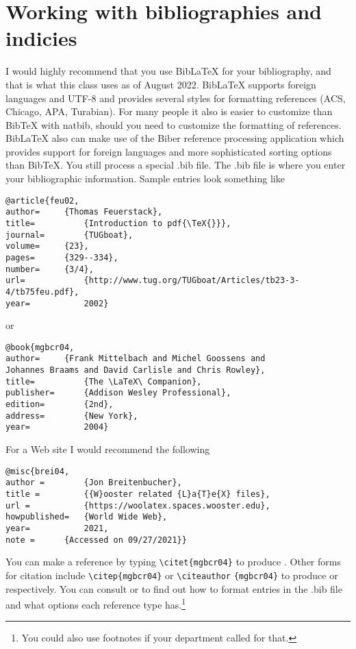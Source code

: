 \chapter{Working with bibliographies and indicies}\label{bibind}
I would highly recommend that you use Bib\LaTeX{} for your bibliography, and that is what this class uses as of August 2022. Bib\LaTeX{} supports foreign languages and UTF-8 and provides several styles for formatting references (ACS, Chicago, APA, Turabian). For many people it also is easier to customize than Bib\TeX{} with natbib, should you need to customize the formatting of references. Bib\LaTeX{} also can make use of the Biber reference processing application which provides support for foreign languages and more sophisticated sorting options than Bib\TeX{}. You still process a special .bib file. The .bib file is where you enter your bibliographic information. Sample entries look something like
\begin{singlespace}\small
\begin{verbatim}
@article{feu02,
author=		{Thomas Feuerstack},
title=			{Introduction to pdf{\TeX{}}}, 
journal=		{TUGboat}, 
volume=		{23},
pages=		{329--334},
number=		{3/4},
url=			{http://www.tug.org/TUGboat/Articles/tb23-3-4/tb75feu.pdf},
year=			2002}
\end{verbatim}
\end{singlespace}
or
\begin{singlespace}\small
\begin{verbatim}
@book{mgbcr04,
author=		{Frank Mittelbach and Michel Goossens and
Johannes Braams and David Carlisle and Chris Rowley},
title=			{The \LaTeX\ Companion},
publisher=		{Addison Wesley Professional},
edition=		{2nd},
address=		{New York},
year=			2004}
\end{verbatim}
\end{singlespace}

For a Web site I would recommend the following
\begin{singlespace}\small
\begin{verbatim}
@misc{brei04,
author = 		{Jon Breitenbucher},
title = 		{{W}ooster related {L}a{T}e{X} files},
url = 			{https://woolatex.spaces.wooster.edu},
howpublished=	{World Wide Web},
year=			2021,
note = 		{Accessed on 09/27/2021}}
\end{verbatim}
\end{singlespace}

You can make a reference by typing \verb|\citet{mgbcr04}| to produce \citet{mgbcr04}. Other forms for citation include \verb|\citep{mgbcr04}| or  \verb|\citeauthor| \verb|{mgbcr04}| to produce \citep{mgbcr04} or \citeauthor{mgbcr04} respectively. You can consult \citet{kd03} or \citet{mgbcr04} to find out how to format entries in the .bib file and what options each reference type has.\footnote{You could also use footnotes if your department called for that.}

